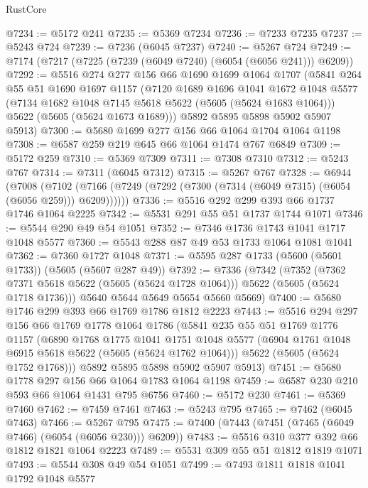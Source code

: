 \begin{lexlean}{RustCore}
\begin{coremodule}
@7234 := @5172 @241
@7235 := @5369 @7234
@7236 := @7233 @7235
@7237 := @5243 @724
@7239 := @7236 (@6045 @7237)
@7240 := @5267 @724
@7249 := @7174 (@7217 (@7225 (@7239 (@6049 @7240) (@6054 (@6056 @241))) @6209))
@7292 := @5516
    @274
    @277
    @156
    @66
    @1690
    @1699
    @1064
    @1707
    (@5841
      @264
      @55
      @51
      @1690
      @1697
      @1157
      (@7120
        @1689
        @1696
        @1041
        @1672
        @1048
        @5577
        (@7134 @1682 @1048 @7145 @5618 @5622 (@5605 (@5624 @1683 @1064)))
        @5622
        (@5605 (@5624 @1673 @1689)))
      @5892
      @5895
      @5898
      @5902
      @5907
      @5913)
@7300 := @5680 @1699 @277 @156 @66 @1064 @1704 @1064 @1198
@7308 := @6587 @259 @219 @645 @66 @1064 @1474 @767 @6849
@7309 := @5172 @259
@7310 := @5369 @7309
@7311 := @7308 @7310
@7312 := @5243 @767
@7314 := @7311 (@6045 @7312)
@7315 := @5267 @767
@7328 := @6944
    (@7008 (@7102 (@7166 (@7249 (@7292 (@7300 (@7314 (@6049 @7315) (@6054 (@6056 @259))) @6209))))))
@7336 := @5516 @292 @299 @393 @66 @1737 @1746 @1064 @2225
@7342 := @5531 @291 @55 @51 @1737 @1744 @1071
@7346 := @5544 @290 @49 @54 @1051
@7352 := @7346 @1736 @1743 @1041 @1717 @1048 @5577
@7360 := @5543 @288 @87 @49 @53 @1733 @1064 @1081 @1041
@7362 := @7360 @1727 @1048
@7371 := @5595 @287 @1733 (@5600 (@5601 @1733)) (@5605 (@5607 @287 @49))
@7392 := @7336
    (@7342
      (@7352
        (@7362 @7371 @5618 @5622 (@5605 (@5624 @1728 @1064)))
        @5622
        (@5605 (@5624 @1718 @1736)))
      @5640
      @5644
      @5649
      @5654
      @5660
      @5669)
@7400 := @5680 @1746 @299 @393 @66 @1769 @1786 @1812 @2223
@7443 := @5516
    @294
    @297
    @156
    @66
    @1769
    @1778
    @1064
    @1786
    (@5841
      @235
      @55
      @51
      @1769
      @1776
      @1157
      (@6890
        @1768
        @1775
        @1041
        @1751
        @1048
        @5577
        (@6904 @1761 @1048 @6915 @5618 @5622 (@5605 (@5624 @1762 @1064)))
        @5622
        (@5605 (@5624 @1752 @1768)))
      @5892
      @5895
      @5898
      @5902
      @5907
      @5913)
@7451 := @5680 @1778 @297 @156 @66 @1064 @1783 @1064 @1198
@7459 := @6587 @230 @210 @593 @66 @1064 @1431 @795 @6756
@7460 := @5172 @230
@7461 := @5369 @7460
@7462 := @7459 @7461
@7463 := @5243 @795
@7465 := @7462 (@6045 @7463)
@7466 := @5267 @795
@7475 := @7400 (@7443 (@7451 (@7465 (@6049 @7466) (@6054 (@6056 @230))) @6209))
@7483 := @5516 @310 @377 @392 @66 @1812 @1821 @1064 @2223
@7489 := @5531 @309 @55 @51 @1812 @1819 @1071
@7493 := @5544 @308 @49 @54 @1051
@7499 := @7493 @1811 @1818 @1041 @1792 @1048 @5577

\end{coremodule}
\end{lexlean}
